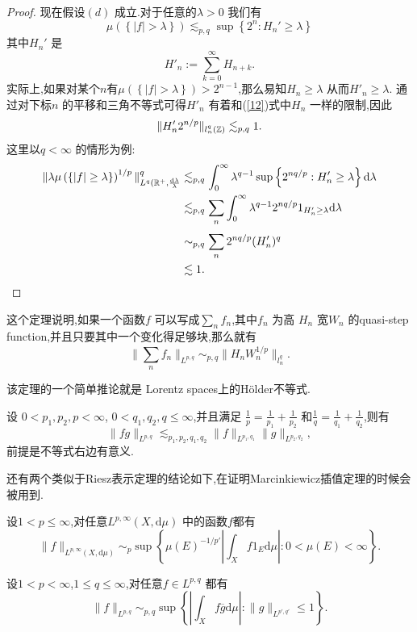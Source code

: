 \begin{proof}
  现在假设$(d)$ 成立.对于任意的$\lambda >0$ 我们有
  \[
  \mu\left( \left\{ |f|>\lambda \right\}  \right) \lesssim_{p,q}\sup \left\{ 2^{n}:H_n'\ge \lambda \right\} 
  \] 
  其中$H_n'$ 是
  \[
  H'_n:=\sum_{k=0}^{\infty} H_{n+k}.
  \]
  实际上,如果对某个$n$有$\mu\left( \left\{ |f|>\lambda \right\}  \right) >2^{n-1}$,那么易知$H_n\ge \lambda$ 从而$H'_n\ge \lambda$.
  通过对下标$n$ 的平移和三角不等式可得$H'_n$ 有着和(\ref{12})式中$H_n$ 一样的限制,因此
  \[
    \| H'_n 2^{n /p}\|_{l^{q}_{n}(\mathbb{Z})}\lesssim_{p,q} 1.
  \] 
  这里以$q<\infty$ 的情形为例:
  \begin{equation*}
    \begin{aligned}
      \|\lambda \mu\left( \left\{ |f|\ge \lambda \right\}  \right) ^{1 /p}\|^{q}_{L^{q}(\mathbb{R}^{+}, \frac{\mathrm{d}\lambda}{\lambda}} & \lesssim_{p,q} \int_{0}^{\infty}\lambda^{q-1}\sup \left\{ 2^{nq /p}:H'_n\ge \lambda \right\} \mathrm{d}\lambda\\
     & \lesssim_{p,q} \sum_{n}^{} \int_0^{\infty}\lambda^{q-1}2^{nq /p} 1_{H'_n\ge \lambda}\mathrm{d}\lambda\\
     & \sim_{p,q}  \sum_{n}^{} 2^{nq /p}(H'_n)^{q}\\
     & \lesssim  1.
    \end{aligned}
  \end{equation*}
\end{proof}
这个定理说明,如果一个函数$f$ 可以写成$\sum_{n}^{} f_n$,其中$f_n$ 为高 $H_n$ 宽$W_n$ 的quasi-step function,并且只要其中一个变化得足够块,那么就有
\[
\|\sum_{n}^{} f_n\|_{L^{p,q}}\sim_{p,q}\|H_n W_n^{1 /p}\|_{l^{q}_n}.
\]

该定理的一个简单推论就是 Lorentz spaces上的H\"{o}lder不等式.
\begin{theorem}
 设 $0<p_1,p_2,p<\infty$, $0<q_1,q_2,q\le \infty$,并且满足 $\frac{1}{p}=\frac{1}{p_1}+\frac{1}{p_2}$ 和$\frac{1}{q}=\frac{1}{q_1}+\frac{1}{q_2}$,则有
 \[
 \|fg\|_{L^{p,q}}\lesssim_{p_1,p_2,q_1,q_2}\|f\|_{L^{p_1,q_1}}\|g\|_{L^{p_2,q_2}},
 \] 
 前提是不等式右边有意义.
\end{theorem}

还有两个类似于Riesz表示定理的结论如下,在证明Marcinkiewicz插值定理的时候会被用到.
\begin{theorem}
  设$1<p\le \infty $,对任意$L^{p,\infty}(X,\mathrm{d}\mu)$ 中的函数$f$都有
   \begin{equation}
     \|f\|_{L^{p,\infty}(X,\mathrm{d}\mu)}\sim_p \sup\left\{ \mu(E)^{-1 /p'} |\int_Xf 1_E \mathrm{d}\mu|:0<\mu(E)<\infty \right\}.\label{1-4} 
  \end{equation}
\end{theorem}
\begin{theorem}\label{thm1-1}
  设$1<p<\infty$,$1\le q\le \infty$,对任意$f\in L^{p,q}$ 都有
  \begin{equation}
    \|f\|_{L^{p,q}}\sim_{p,q}\sup\left\{ |\int_{X}f\overline{g}\mathrm{d}\mu|:\|g\|_{L^{p',q'}}\le 1 \right\}. 
  \end{equation}
\end{theorem}

